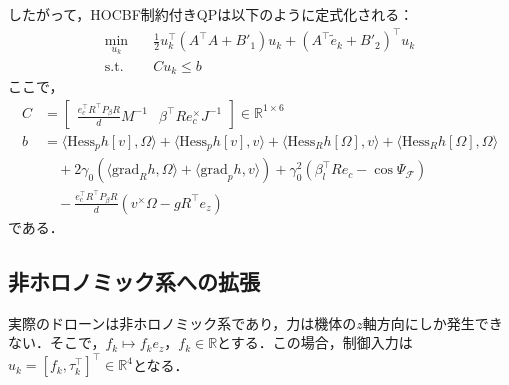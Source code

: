 したがって，HOCBF制約付きQPは以下のように定式化される：
\begin{equation}
\begin{aligned}
\min_{u_k} \quad & \frac{1}{2} u_k^\top (A^\top A + B'_1) u_k + (A^\top \tilde{e}_k + B'_2)^\top u_k \\
\mathrm{s.t.} \quad & C u_k \leq b
\label{eq:single_hocbf_qp}
\end{aligned}
\end{equation}
ここで，
\begin{equation}
\begin{aligned}
C &= \begin{bmatrix} \frac{e_c^\top R^\top P_\beta R}{d} M^{-1} & \beta^\top R e_c^\times J^{-1} \end{bmatrix} \in \mathbb{R}^{1 \times 6} \\
b &= \langle \mathrm{Hess}_p h[v], \Omega \rangle + \langle \mathrm{Hess}_p h[v], v \rangle + \langle \mathrm{Hess}_R h[\Omega], v \rangle + \langle \mathrm{Hess}_R h[\Omega], \Omega \rangle \\
&\quad + 2\gamma_0 (\langle \mathrm{grad}_R h, \Omega \rangle + \langle \mathrm{grad}_p h, v \rangle) + \gamma_0^2 (\beta_l^\top R e_c - \cos\Psi_{\mathcal{F}}) \\
&\quad - \frac{e_c^\top R^\top P_\beta R}{d} (v^\times \Omega - g R^\top e_z)
\label{eq:single_hocbf_qp_params}
\end{aligned}
\end{equation}
である．

\subsection{非ホロノミック系への拡張}

実際のドローンは非ホロノミック系であり，力は機体の$z$軸方向にしか発生できない．そこで，$f_k \mapsto f_k e_z$，$f_k \in \mathbb{R}$とする．この場合，制御入力は$u_k = [f_k, \tau_k^\top]^\top \in \mathbb{R}^4$となる．

